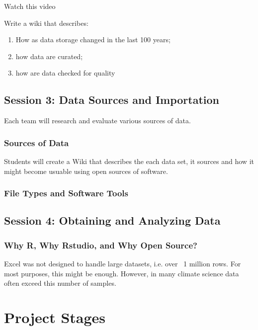 \documentclass{article}\usepackage[]{graphicx}\usepackage[]{color}
\begin{document}
Watch this video

Write a wiki that describes: 

\begin{enumerate}
  \item How as data storage changed in the last 100 years;
  \item how data are curated; 
  \item how are data checked for quality
\end{enumerate}


\subsection{Session 3: Data Sources and Importation}

Each team will research and evaluate various sources of data.

\subsubsection{Sources of Data}

Students will create a Wiki that describes the each data set, it sources and how it might become usuable using open sources of software.

\subsubsection{File Types and Software Tools}


\subsection{Session 4: Obtaining and Analyzing Data}

\subsubsection{Why R, Why Rstudio, and Why Open Source?}

Excel was not designed to handle large datasets, i.e. over ~1 million rows. For most purposes, this might be enough. However, in many climate science data often exceed this number of samples. 

\section{Project Stages}
\end{document}
